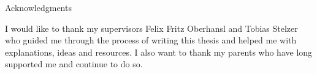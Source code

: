 \thispagestyle{empty}

\vspace*{20mm}

\begin{center}
{ Acknowledgments}
\end{center}

\vspace{10mm}


I would like to thank my supervisors Felix Fritz Oberhansl and Tobias Stelzer who guided me through the process of writing this thesis and helped me with explanations, ideas and resources. I also want to thank my parents who have long supported me and continue to do so.

\cleardoublepage{}
